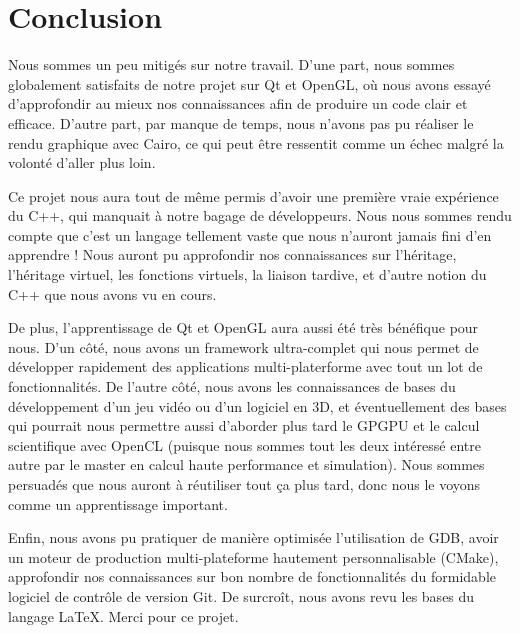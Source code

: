 \documentclass[11pt]{article}
\begin{document}
\section{Conclusion}

Nous sommes un peu mitigés sur notre travail. D'une part, nous sommes
globalement satisfaits de notre projet sur Qt et OpenGL, où nous avons essayé
d'approfondir au mieux nos connaissances afin de produire un code clair et
efficace. D'autre part, par manque de temps, nous n'avons pas pu réaliser le
rendu graphique avec Cairo, ce qui peut être ressentit comme un échec malgré la
volonté d'aller plus loin.

Ce projet nous aura tout de même permis d'avoir une première vraie expérience du
C++, qui manquait à notre bagage de développeurs. Nous nous sommes rendu compte
que c'est un langage tellement vaste que nous n'auront jamais fini d'en
apprendre ! Nous auront pu approfondir nos connaissances sur l'héritage,
l'héritage virtuel, les fonctions virtuels, la liaison tardive, et d'autre
notion du C++ que nous avons vu en cours.

De plus, l'apprentissage de Qt et OpenGL aura aussi été très bénéfique pour
nous. D'un côté, nous avons un framework ultra-complet qui nous permet de
développer rapidement des applications multi-platerforme avec tout un lot de
fonctionnalités. De l'autre côté, nous avons les connaissances de bases du
développement d'un jeu vidéo ou d'un logiciel en 3D, et éventuellement des bases
qui pourrait nous permettre aussi d'aborder plus tard le GPGPU et le calcul
scientifique avec OpenCL (puisque nous sommes tout les deux intéressé entre
autre par le master en calcul haute performance et simulation). Nous sommes
persuadés que nous auront à réutiliser tout ça plus tard, donc nous le voyons
comme un apprentissage important. 

Enfin, nous avons pu pratiquer de manière optimisée l'utilisation de GDB, avoir
un moteur de production multi-plateforme hautement personnalisable (CMake),
approfondir nos connaissances sur bon nombre de fonctionnalités du formidable
logiciel de contrôle de version Git. De surcroît, nous avons revu les bases du
langage LaTeX. Merci pour ce projet.
\end{document}
